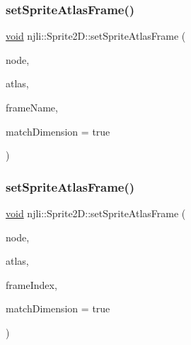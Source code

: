 \subsubsection{\texorpdfstring{set\+Sprite\+Atlas\+Frame()}{setSpriteAtlasFrame()}\hspace{0.1cm}{\footnotesize\ttfamily [4/5]}}
{\footnotesize\ttfamily \mbox{\hyperlink{_thread_8h_af1e856da2e658414cb2456cb6f7ebc66}{void}} njli\+::\+Sprite2\+D\+::set\+Sprite\+Atlas\+Frame (\begin{DoxyParamCaption}\item[{\mbox{\hyperlink{classnjli_1_1_node}{Node}} $\ast$}]{node,  }\item[{\mbox{\hyperlink{classnjli_1_1_sprite_frame_atlas}{Sprite\+Frame\+Atlas}} $\ast$}]{atlas,  }\item[{const char $\ast$}]{frame\+Name,  }\item[{bool}]{match\+Dimension = {\ttfamily true} }\end{DoxyParamCaption})}

\mbox{\label{classnjli_1_1_sprite2_d_a17b3bca9c69dda742fbf86a6853204ee}} 
\subsubsection{\texorpdfstring{set\+Sprite\+Atlas\+Frame()}{setSpriteAtlasFrame()}\hspace{0.1cm}{\footnotesize\ttfamily [5/5]}}
{\footnotesize\ttfamily \mbox{\hyperlink{_thread_8h_af1e856da2e658414cb2456cb6f7ebc66}{void}} njli\+::\+Sprite2\+D\+::set\+Sprite\+Atlas\+Frame (\begin{DoxyParamCaption}\item[{\mbox{\hyperlink{classnjli_1_1_node}{Node}} $\ast$}]{node,  }\item[{\mbox{\hyperlink{classnjli_1_1_sprite_frame_atlas}{Sprite\+Frame\+Atlas}} $\ast$}]{atlas,  }\item[{int}]{frame\+Index,  }\item[{bool}]{match\+Dimension = {\ttfamily true} }\end{DoxyParamCaption})}

\mbox{\label{classnjli_1_1_sprite2_d_a4d706d6c031c824764e933233829e63a}} 
